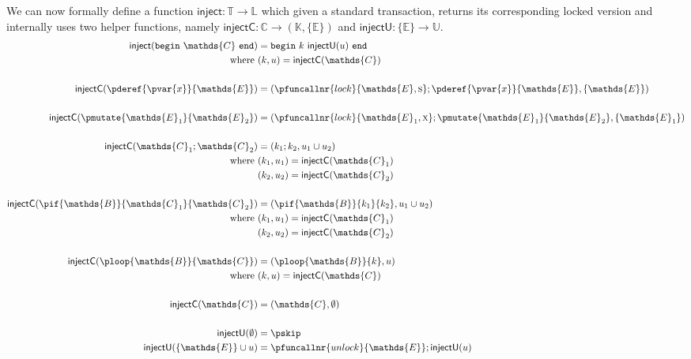 We can now formally define a function $\textsf{inject} : \mathds{T} \rightarrow \mathds{L}$ which given a standard transaction, returns its corresponding locked version and internally uses two helper functions, namely $\textsf{injectC} : \mathds{C} \rightarrow (\mathds{K}, \{\mathds{E}\})$ and $\textsf{injectU} : \{\mathds{E}\} \rightarrow \mathds{U}$.
\begin{align*}
\textsf{inject}(\mathtt{begin}\ \mathds{C}\ \mathtt{end}) &= \mathtt{begin}\ k\ \textsf{injectU}(u)\ \mathtt{end} \\
\text{where } & (k, u) = \textsf{injectC}(\mathds{C}) \\
\\
\textsf{injectC}(\pderef{\pvar{x}}{\mathds{E}}) &= (\pfuncallnr{lock}{\mathds{E}, \textsc{s}}; \pderef{\pvar{x}}{\mathds{E}}, \{ \mathds{E} \}) \\
\\
\textsf{injectC}(\pmutate{\mathds{E}_1}{\mathds{E}_2}) &= (\pfuncallnr{lock}{\mathds{E}_1, \textsc{x}}; \pmutate{\mathds{E}_1}{\mathds{E}_2}, \{ \mathds{E}_1 \}) \\
\\
\textsf{injectC}(\mathds{C}_1; \mathds{C}_2) &= (k_1; k_2, u_1 \cup u_2) \\
\text{where } & (k_1, u_1) = \textsf{injectC}(\mathds{C}_1) \\
& (k_2, u_2) = \textsf{injectC}(\mathds{C}_2) \\
\\
\textsf{injectC}(\pif{\mathds{B}}{\mathds{C}_1}{\mathds{C}_2}) &= (\pif{\mathds{B}}{k_1}{k_2}, u_1 \cup u_2) \\
\text{where } & (k_1, u_1) = \textsf{injectC}(\mathds{C}_1) \\
& (k_2, u_2) = \textsf{injectC}(\mathds{C}_2) \\
\\
\textsf{injectC}(\ploop{\mathds{B}}{\mathds{C}}) &= (\ploop{\mathds{B}}{k}, u) \\
\text{where } & (k, u) = \textsf{injectC}(\mathds{C}) \\
\\
\textsf{injectC}(\mathds{C}) &= (\mathds{C}, \emptyset) \\
\\
\textsf{injectU}(\emptyset) &= \pskip \\ 
\textsf{injectU}(\{\mathds{E}\} \cup u) &= \pfuncallnr{unlock}{\mathds{E}}; \textsf{injectU}(u)
\end{align*}

